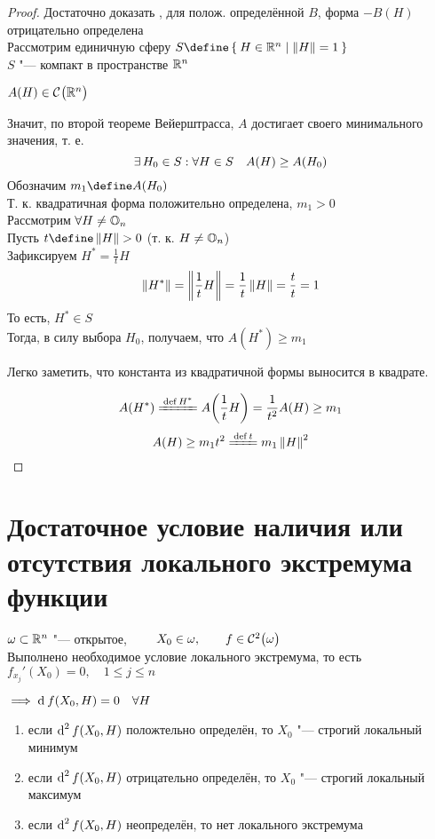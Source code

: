 \begin{proof}
	Достаточно доказать , \as для полож. определённой $ B $, форма $ -B(H) $ отрицательно определена \\
	Рассмотрим единичную сферу $ S \define \set{H \in \R^n | \norm{H} = 1} $ \\
	$ S $ "--- компакт в пространстве $ \R^n $
	\begin{intuition}
		$ A(H) \in \Cont{\R^n} $
	\end{intuition}
	Значит, по второй теореме Вейерштрасса, $ A $ достигает своего минимального значения, т. е.
	$$ \exist H_0 \in S : \forall H \in S \quad A(H) \ge A(H_0) $$
	Обозначим $ m_1 \define A(H_0) $ \\
	Т. к. квадратичная форма положительно определена, $ m_1 > 0 $ \\
	Рассмотрим $ \forall H \ne \On $ \\
	Пусть $ t \define \norm{H} > 0 $ (т. к. $ H \ne \On $) \\
	Зафиксируем $ H^* = \frac1t H $
	$$ \norm{H^*} = \norm{\frac1tH} = \frac1t\norm{H} = \frac{t}t = 1 $$
	То есть, $ H^* \in S $ \\
	Тогда, в силу выбора $ H_0 $, получаем, что $ A(H^*) \ge m_1 $
	\begin{remark}
		Легко заметить, что константа из квадратичной формы выносится в квадрате.
	\end{remark}
	$$ A(H^*) \bdefeq{H^*} A \bigg( \frac1tH \bigg) = \frac1{t^2}A(H) \ge m_1 $$
	$$ A(H) \ge m_1t^2 \bdefeq{t} m_1 \norm{H}^2 $$
\end{proof}

\section{Достаточное условие наличия или отсутствия локального экстремума функции}

\begin{theorem}
	$ \omega \sub \R^n $ "--- открытое, $ \qquad X_0 \in \omega, \qquad f \in \Cont[2]\omega $ \\
	Выполнено необходимое условие локального экстремума, то есть $ f_{x_j}'(X_0) = 0, \quad 1 \le j \le n $
	\begin{remark}
		$ \implies \di f(X_0, H) = 0 \quad \forall H $
	\end{remark}
	\begin{enumerate}
		\item\label{th:extremum:4} если $ \di[2] f(X_0, H) $ положтельно определён, то $ X_0 $ "--- строгий локальный минимум

		\item\label{th:extremum:5} если $ \di[2] f(X_0, H) $ отрицательно определён, то $ X_0 $ "--- строгий локальный максимум

		\item\label{th:extremum:6} если $ \di[2] f(X_0, H) $ неопределён, то нет локального экстремума
	\end{enumerate}
\end{theorem}

